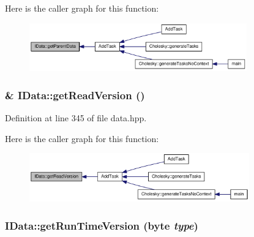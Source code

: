 Here is the caller graph for this function:\nopagebreak
\begin{figure}[H]
\begin{center}
\leavevmode
\includegraphics[width=266pt]{class_i_data_a44b0310e7c4e7ddd9a9656f857b7d382_icgraph}
\end{center}
\end{figure}
\hypertarget{class_i_data_a0c16a5178f9f66eb3df346b82fbd9608}{
\subsubsection[{getReadVersion}]{\& IData::getReadVersion ()}}
\label{class_i_data_a0c16a5178f9f66eb3df346b82fbd9608}


Definition at line 345 of file data.hpp.

Here is the caller graph for this function:\nopagebreak
\begin{figure}[H]
\begin{center}
\leavevmode
\includegraphics[width=269pt]{class_i_data_a0c16a5178f9f66eb3df346b82fbd9608_icgraph}
\end{center}
\end{figure}
\hypertarget{class_i_data_af9db5134f13b3c512451eb412c1f5daf}{
\subsubsection[{getRunTimeVersion}]{ IData::getRunTimeVersion ({\bf byte} {\em type})}}
\label{class_i_data_af9db5134f13b3c512451eb412c1f5daf}


